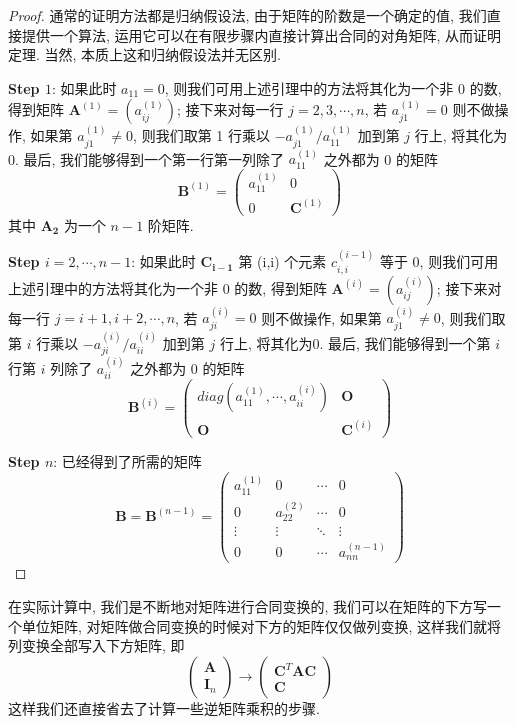 \documentclass[UTF8]{book}
\begin{document}
\begin{proof}
    通常的证明方法都是归纳假设法, 由于矩阵的阶数是一个确定的值, 
    我们直接提供一个算法, 运用它可以在有限步骤内直接计算出合同的对角矩阵, 
    从而证明定理. 当然, 本质上这和归纳假设法并无区别. 

    \textbf{Step $1$}: 
    如果此时 $a_{11} = 0$, 则我们可用上述引理中的方法将其化为一个非 0 的数, 
    得到矩阵 $\boldsymbol{A}^{(1)} = (a_{ij}^{(1)})$; 
    接下来对每一行 $j = 2,3,\cdots,n$, 若 $a_{j1}^{(1)}=0$ 则不做操作, 
    如果第 $a_{j1}^{(1)}\neq 0$, 则我们取第 1 行乘以 
    $-a_{j1}^{(1)}/a_{11}^{(1)}$ 
    加到第 $j$ 行上, 将其化为0. 
    最后, 我们能够得到一个第一行第一列除了 $a_{11}^{(1)}$ 之外都为 0 的矩阵 
    $$\boldsymbol{B}^{(1)}=
    \begin{pmatrix}
        a_{11}^{(1)} & 0 \\
        0 & \boldsymbol{C}^{(1)}
    \end{pmatrix}
    $$
    其中 $\boldsymbol{A_2}$ 为一个 $n-1$ 阶矩阵. 

    \textbf{Step $i=2,\cdots,n-1$}: 
    如果此时 $\boldsymbol{C_{i-1}}$ 第 (i,i) 个元素 $c_{i,i}^{(i-1)}$ 等于 0, 
    则我们可用上述引理中的方法将其化为一个非 0 的数, 
    得到矩阵 $\boldsymbol{A}^{(i)} = (a_{ij}^{(i)})$; 
    接下来对每一行 $j = i+1,i+2,\cdots,n$, 若 $a_{ji}^{(i)}=0$ 则不做操作, 
    如果第 $a_{j1}^{(i)}\neq 0$, 则我们取第 $i$ 行乘以 
    $-a_{ji}^{(i)}/a_{ii}^{(i)}$ 
    加到第 $j$ 行上, 将其化为0. 
    最后, 我们能够得到一个第 $i$ 行第 $i$ 列除了 $a_{ii}^{(i)}$ 之外都为 0 的矩阵 
    $$\boldsymbol{B}^{(i)}=
    \begin{pmatrix}
        diag(a_{11}^{(1)},\cdots,a_{ii}^{(i)}) & \boldsymbol{O}   \\
        \boldsymbol{O}& \boldsymbol{C}^{(i)}
    \end{pmatrix}
    $$

    \textbf{Step $n$}: 已经得到了所需的矩阵 
    $$\boldsymbol{B} =\boldsymbol{B}^{(n-1)} =
    \begin{pmatrix}
        a_{11}^{(1)} & 0 & \cdots & 0 \\
        0 & a_{22}^{(2)} & \cdots & 0 \\
        \vdots & \vdots & \ddots & \vdots \\
        0 & 0 & \cdots & a_{nn}^{(n-1)}
    \end{pmatrix}
    $$
\end{proof}

在实际计算中, 我们是不断地对矩阵进行合同变换的, 
我们可以在矩阵的下方写一个单位矩阵, 
对矩阵做合同变换的时候对下方的矩阵仅仅做列变换, 
这样我们就将列变换全部写入下方矩阵, 即 
\begin{equation*}
    \begin{pmatrix}
        \boldsymbol{A} \\
        \boldsymbol{I}_n
    \end{pmatrix}
    \longrightarrow
    \begin{pmatrix}
        \boldsymbol{C}^T \boldsymbol{A}\boldsymbol{C} \\
        \boldsymbol{C}
    \end{pmatrix}
\end{equation*}
这样我们还直接省去了计算一些逆矩阵乘积的步骤. 
\end{document}
